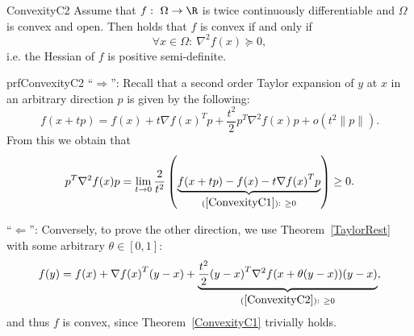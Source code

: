 \begin{theo}{ConvexityC2}
    Assume that $f: \ \Omega \rightarrow \R$ is twice continuously differentiable and $\Omega$ is convex and open. Then holds that $f$ is convex if and only if
    \begin{equation*}
        \forall x \in \Omega: \ \nabla^2 f(x) \succeq 0,
    \end{equation*}
    i\@.e\@. the Hessian of $f$ is positive semi-definite.
\end{theo}

\begin{prf}{prfConvexityC2}
    ``$\Rightarrow$'': Recall that a second order Taylor expansion of $y$ at $x$ in an arbitrary direction $p$ is given by the following:
    \begin{equation*}
        f(x + tp) = f(x) + t \nabla {f(x)}^T p + \frac{t^2}{2} p^T \nabla^2 f(x) p + o(t^2\|p\|).
    \end{equation*}
    From this we obtain that
    \begin{equation*}
        p^T \nabla^2 f(x) p = \lim_{t \rightarrow 0} \frac{2}{t^2} \left(\underset{(\ref*{ConvexityC1}): \ \geq 0}{\underbrace{f(x + tp) - f(x) - t \nabla {f(x)}^T p}}\right) \geq 0.
    \end{equation*}

    ``$\Leftarrow$'': Conversely, to prove the other direction, we use Theorem~\ref{TaylorRest} with some arbitrary $\theta \in [0,1]$:
    \begin{equation*}
        f(y) = f(x) + \nabla {f(x)}^T(y-x) + \underset{(\ref*{ConvexityC2}): \ \geq 0}{\underbrace{\frac{t^2}{2} {(y-x)}^T \nabla^2 f(x + \theta(y-x)) (y-x)}},
    \end{equation*}
    and thus $f$ is convex, since Theorem~\ref{ConvexityC1} trivially holds.
\end{prf}

